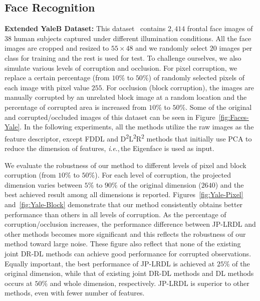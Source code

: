 \documentclass[journal]{IEEEtran}
\newcommand{\ie}{\textit{i}.\textit{e}.,\,}
\begin{document}
\subsection{Face Recognition}
\textbf{Extended YaleB Dataset:} This dataset~\cite{Yale} contains $2,414$ frontal face images of $38$ human subjects captured under different illumination conditions. All the face images are cropped and resized to $55 \times 48$ and we randomly select $20$ images per class for training and the rest is used for test. To challenge ourselves, we also simulate various levels of corruption and occlusion. For pixel corruption, we replace a certain percentage (from $10\%$ to $50\%$) of randomly selected pixels of each image with pixel value $255$. For occlusion (block corruption), the images are manually corrupted by an unrelated block image at a random location and the percentage of corrupted area is increased from $10\%$ to $50\%$. Some of the original and corrupted/occluded images of this dataset can be seen in Figure~\ref{fig:Faces-Yale}. In the following experiments, all the methods utilize the raw images as the feature descriptor, except FDDL and D\textsuperscript{2}L\textsuperscript{2}R\textsuperscript{2} methods that initially use PCA to reduce the dimension of features, \ie the Eigenface is used as input.

We evaluate the robustness of our method to different levels of pixel and block corruption (from $10\%$ to $50\%$). For each level of corruption, the projected dimension varies between $5\%$ to $90\%$ of the original dimension ($2640$) and the best achieved result among all dimensions is reported. Figures~\ref{fig:Yale-Pixel} and~\ref{fig:Yale-Block} demonstrate that our method consistently obtains better performance than others in all levels of corruption. As the percentage of corruption/occlusion increases, the performance difference between JP-LRDL and other methods becomes more significant and this reflects the robustness of our method toward large noise. These figure also reflect that none of the existing joint DR-DL methods can achieve good performance for corrupted observations. Equally important, the best performance of JP-LRDL is achieved at $25\%$ of the original dimension, while that of existing joint DR-DL methods and DL methods occurs at $50\%$ and whole dimension, respectively. JP-LRDL is superior to other methods, even with fewer number of features.
\end{document}
